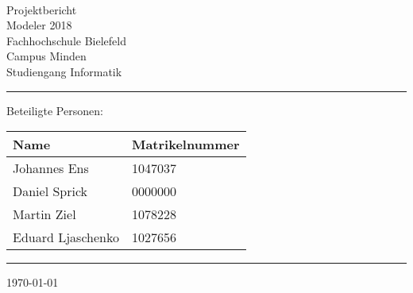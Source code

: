 


\begin{titlepage}
   \mbox{}\vspace{5\baselineskip}\\
   \sffamily\huge
   \centering
   {\Huge Projektbericht} \\
   \normalsize Modeler 2018
   \vspace{3\baselineskip}\\
   \rmfamily\Large
  Fachhochschule Bielefeld \\
  Campus Minden \\
  Studiengang Informatik
   \vspace{1\baselineskip}\\
\noindent\rule{15cm}{0.3pt}
Beteiligte Personen:
\begin{table}[H]
	\tablestyle
	\begin{tabular}{*{2}{v{0.45\textwidth}}}
		\hline
		\textbf{Name} &
		\textbf{Matrikelnummer} \tabularnewline
		\hline
		Johannes Ens & 1047037\tabularnewline
		Daniel Sprick & 0000000\tabularnewline
		Martin Ziel & 1078228\tabularnewline
		Eduard Ljaschenko& 1027656\tabularnewline

	\end{tabular}
\end{table}
   \noindent\rule{15cm}{0.4pt}

   \today
\end{titlepage}

